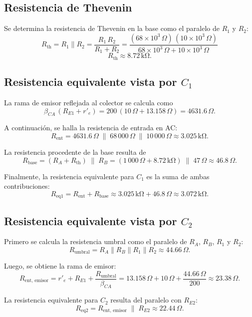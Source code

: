 \documentclass[journal]{IEEEtran}
\begin{document}
\subsection*{Resistencia de Thevenin}
\par Se determina la resistencia de Thevenin en la base como el paralelo de \(R_1\) y \(R_2\):
\[R_{\mathrm{th}}
= R_1 \parallel R_2
= \frac{R_1\,R_2}{R_1 + R_2}
= \frac{(68\times10^3\,\Omega)\,(10\times10^3\,\Omega)}{68\times10^3\,\Omega + 10\times10^3\,\Omega}\]
\[R_{\mathrm{th}}\approx 8.72\,\mathrm{k\Omega}.\]

\subsection*{Resistencia equivalente vista por \(C_1\)}
\par La rama de emisor reflejada al colector se calcula como
\[
\beta_{CA}\,(R_{E1} + r'_e)
= 200\,(10\,\Omega + 13.158\,\Omega)
= 4631.6\,\Omega.
\]
\par A continuación, se halla la resistencia de entrada en AC:
\[
R_{\mathrm{ent}}
= 4631.6\,\Omega \;\parallel\; 68\,000\,\Omega \;\parallel\; 10\,000\,\Omega
\approx 3.025\,\mathrm{k\Omega}.
\]
\par La resistencia procedente de la base resulta de
\[
R_{\mathrm{base}}
= (R_A + R_{\mathrm{th}})\;\parallel\;R_B
= (1\,000\,\Omega + 8.72\,\mathrm{k\Omega})\;\parallel\;47\,\Omega
\approx 46.8\,\Omega.
\]
\par Finalmente, la resistencia equivalente para \(C_1\) es la suma de ambas contribuciones:
\[
R_{\mathrm{eq1}}
= R_{\mathrm{ent}} + R_{\mathrm{base}}
\approx 3.025\,\mathrm{k\Omega} + 46.8\,\Omega
\approx 3.072\,\mathrm{k\Omega}.
\]

\subsection*{Resistencia equivalente vista por \(C_2\)}
\par Primero se calcula la resistencia umbral como el paralelo de \(R_A\), \(R_B\), \(R_1\) y \(R_2\):
\[
R_{\mathrm{umbral}}
= R_A \parallel R_B \parallel R_1 \parallel R_2
\approx 44.66\,\Omega.
\]
\par Luego, se obtiene la rama de emisor:
\[
R_{\mathrm{ent,\,emisor}}
= r'_e + R_{E1} + \frac{R_{\mathrm{umbral}}}{\beta_{CA}}
= 13.158\,\Omega + 10\,\Omega + \frac{44.66\,\Omega}{200}
\approx 23.38\,\Omega.
\]
\par La resistencia equivalente para \(C_2\) resulta del paralelo con \(R_{E2}\):
\[
R_{\mathrm{eq2}}
= R_{\mathrm{ent,\,emisor}} \;\parallel\; R_{E2}
\approx 22.44\,\Omega.
\]
\end{document}
